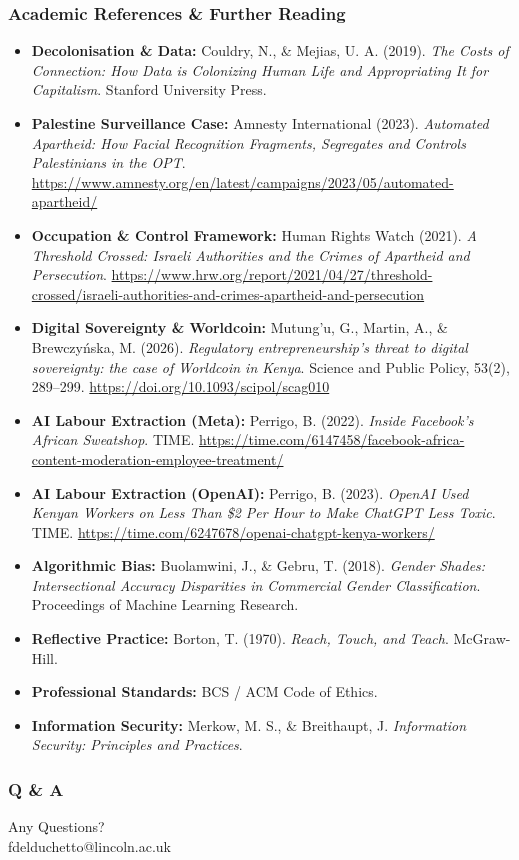 \documentclass[xcolor=table]{beamer}
\begin{document}
\begin{frame}
    \frametitle{Academic References \& Further Reading}
    \tiny
    \begin{itemize}
        \item \textbf{Decolonisation \& Data:} Couldry, N., \& Mejias, U. A. (2019). \textit{The Costs of Connection: How Data is Colonizing Human Life and Appropriating It for Capitalism}. Stanford University Press.
        \item \textbf{Palestine Surveillance Case:} Amnesty International (2023). \textit{Automated Apartheid: How Facial Recognition Fragments, Segregates and Controls Palestinians in the OPT}. \url{https://www.amnesty.org/en/latest/campaigns/2023/05/automated-apartheid/}
        \item \textbf{Occupation \& Control Framework:} Human Rights Watch (2021). \textit{A Threshold Crossed: Israeli Authorities and the Crimes of Apartheid and Persecution}. \url{https://www.hrw.org/report/2021/04/27/threshold-crossed/israeli-authorities-and-crimes-apartheid-and-persecution}
        \item \textbf{Digital Sovereignty \& Worldcoin:} Mutung'u, G., Martin, A., \& Brewczy\'nska, M. (2026). \textit{Regulatory entrepreneurship's threat to digital sovereignty: the case of Worldcoin in Kenya}. Science and Public Policy, 53(2), 289--299. \url{https://doi.org/10.1093/scipol/scag010}
        \item \textbf{AI Labour Extraction (Meta):} Perrigo, B. (2022). \textit{Inside Facebook's African Sweatshop}. TIME. \url{https://time.com/6147458/facebook-africa-content-moderation-employee-treatment/}
        \item \textbf{AI Labour Extraction (OpenAI):} Perrigo, B. (2023). \textit{OpenAI Used Kenyan Workers on Less Than \$2 Per Hour to Make ChatGPT Less Toxic}. TIME. \url{https://time.com/6247678/openai-chatgpt-kenya-workers/}
        \item \textbf{Algorithmic Bias:} Buolamwini, J., \& Gebru, T. (2018). \textit{Gender Shades: Intersectional Accuracy Disparities in Commercial Gender Classification}. Proceedings of Machine Learning Research.
        \item \textbf{Reflective Practice:} Borton, T. (1970). \textit{Reach, Touch, and Teach}. McGraw-Hill.
        \item \textbf{Professional Standards:} BCS / ACM Code of Ethics.
        \item \textbf{Information Security:} Merkow, M. S., \& Breithaupt, J. \textit{Information Security: Principles and Practices}.
    \end{itemize}
\end{frame}

\begin{frame}
    \frametitle{Q \& A}
    \begin{center}
        \Huge Any Questions?\\\vspace{0.5cm} 
        \normalsize fdelduchetto@lincoln.ac.uk
    \end{center}
\end{frame}
\end{document}
